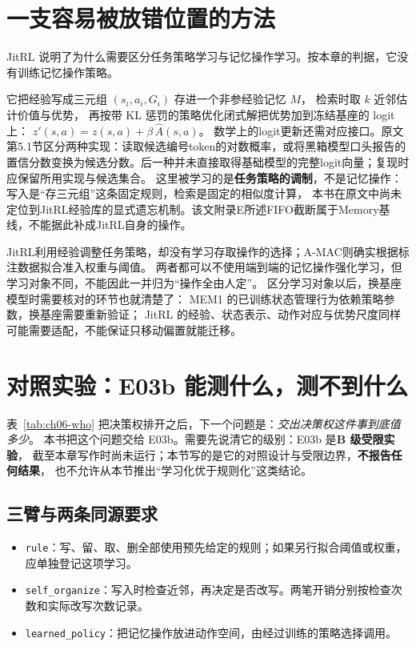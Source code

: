\section{一支容易被放错位置的方法}
\label{sec:ch06-jitrl}

JitRL 说明了为什么需要区分任务策略学习与记忆操作学习。按本章的判据，它没有训练记忆操作策略。

它把经验写成三元组 $(s_i,a_i,G_i)$ 存进一个非参经验记忆 $M$，
检索时取 $k$ 近邻估计价值与优势，
再按带 KL 惩罚的策略优化闭式解把优势加到冻结基座的 logit 上：
$z'(s,a)=z(s,a)+\beta\,\hat A(s,a)$\cite{jitrl-2601}。
数学上的logit更新还需对应接口。原文第5.1节区分两种实现：读取候选编号token的对数概率，或将黑箱模型口头报告的置信分数变换为候选分数。后一种并未直接取得基础模型的完整logit向量；复现时应保留所用实现与候选集合。
这里被学习的是\textbf{任务策略的调制}，不是记忆操作：
写入是“存三元组”这条固定规则，检索是固定的相似度计算，
本书在原文中尚未定位到JitRL经验库的显式遗忘机制\cite{jitrl-2601}。该文附录E所述FIFO截断属于Memory基线，不能据此补成JitRL自身的操作。

JitRL利用经验调整任务策略，却没有学习存取操作的选择；A-MAC则确实根据标注数据拟合准入权重与阈值。
两者都可以不使用端到端的记忆操作强化学习，但学习对象不同，不能因此一并归为“操作全由人定”。
区分学习对象以后，换基座模型时需要核对的环节也就清楚了：
MEM1 的已训练状态管理行为依赖策略参数，换基座需要重新验证；
JitRL 的经验、状态表示、动作对应与优势尺度同样可能需要适配，不能保证只移动偏置就能迁移。



\section{对照实验：E03b 能测什么，测不到什么}
\label{sec:ch06-e03b}

表~\ref{tab:ch06-who} 把决策权排开之后，下一个问题是：\emph{交出决策权这件事到底值多少}。
本书把这个问题交给 E03b。需要先说清它的级别：E03b 是\textbf{B 级受限实验}，
截至本章写作时尚未运行；本节写的是它的对照设计与受限边界，\textbf{不报告任何结果}，
也不允许从本节推出“学习化优于规则化”这类结论。

\subsection*{三臂与两条同源要求}

\begin{itemize}
  \item \texttt{rule}：写、留、取、删全部使用预先给定的规则；如果另行拟合阈值或权重，应单独登记这项学习。
  \item \texttt{self\_organize}：写入时检查近邻，再决定是否改写。两笔开销分别按检查次数和实际改写次数记录。
  \item \texttt{learned\_policy}：把记忆操作放进动作空间，由经过训练的策略选择调用。
\end{itemize}


